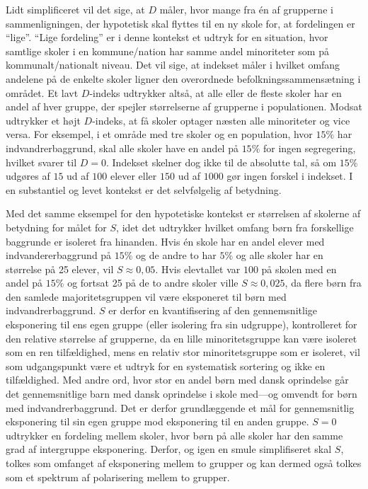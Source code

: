 \documentclass[
]{book}
\begin{document}
Lidt simplificeret vil det sige, at \(D\) måler, hvor mange fra én af grupperne i sammenligningen, der hypotetisk skal flyttes til en ny skole for, at fordelingen er ``lige''. ``Lige fordeling'' er i denne kontekst et udtryk for en situation, hvor samtlige skoler i en kommune/nation har samme andel minoriteter som på kommunalt/nationalt niveau. Det vil sige, at indekset måler i hvilket omfang andelene på de enkelte skoler ligner den overordnede befolkningssammensætning i området. Et lavt \(D\)-indeks udtrykker altså, at alle eller de fleste skoler har en andel af hver gruppe, der spejler størrelserne af grupperne i populationen. Modsat udtrykker et højt \(D\)-indeks, at få skoler optager næsten alle minoriteter og vice versa. For eksempel, i et område med tre skoler og en population, hvor \(15\%\) har indvandrerbaggrund, skal alle skoler have en andel på \(15\%\) for ingen segregering, hvilket svarer til \(D=0\). Indekset skelner dog ikke til de absolutte tal, så om \(15\%\) udgøres af \(15\) ud af \(100\) elever eller \(150\) ud af \(1000\) gør ingen forskel i indekset. I en substantiel og levet kontekst er det selvfølgelig af betydning.

Med det samme eksempel for den hypotetiske kontekst er størrelsen af skolerne af betydning for målet for \(S\), idet det udtrykker hvilket omfang børn fra forskellige baggrunde er isoleret fra hinanden. Hvis én skole har en andel elever med indvandererbaggrund på \(15\%\) og de andre to har \(5\%\) og alle skoler har en størrelse på 25 elever, vil \(S \approx 0,05\). Hvis elevtallet var \(100\) på skolen med en andel på \(15\%\) og fortsat 25 på de to andre skoler ville \(S \approx 0,025\), da flere børn fra den samlede majoritetsgruppen vil være eksponeret til børn med indvandrerbaggrund. \(S\) er derfor en kvantifisering af den gennemsnitlige eksponering til ens egen gruppe (eller isolering fra sin udgruppe), kontrolleret for den relative størrelse af grupperne, da en lille minoritetsgruppe kan være isoleret som en ren tilfældighed, mens en relativ stor minoritetsgruppe som er isoleret, vil som udgangspunkt være et udtryk for en systematisk sortering og ikke en tilfældighed. Med andre ord, hvor stor en andel børn med dansk oprindelse går det gennemsnitlige barn med dansk oprindelse i skole med---og omvendt for børn med indvandrerbaggrund. Det er derfor grundlæggende et mål for gennemsnitlig eksponering til sin egen gruppe mod eksponering til en anden gruppe. \(S=0\) udtrykker en fordeling mellem skoler, hvor børn på alle skoler har den samme grad af intergruppe eksponering. Derfor, og igen en smule simplifiseret skal \(S\), tolkes som omfanget af eksponering mellem to grupper og kan dermed også tolkes som et spektrum af polarisering mellem to grupper.
\end{document}
